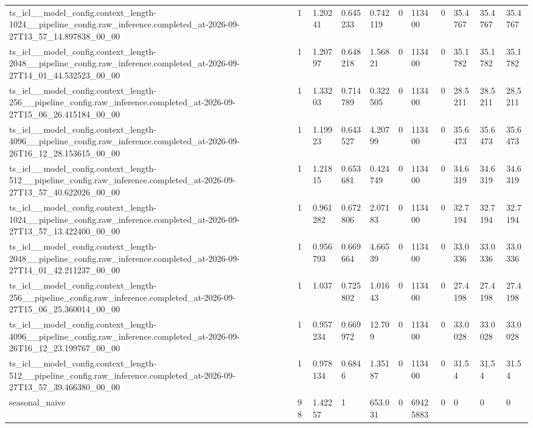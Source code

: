 \begin{tabular}{lllllllllll}
ts\_icl\_\_model\_config.context\_length-1024\_\_pipeline\_config.raw\_inference.completed\_at-2026-09-27T13\_57\_14.897838\_00\_00 & 1 & 1.20241 & 0.645233 & 0.742119 & 0 & 113400 & 0 & 35.4767 & 35.4767 & 35.4767 \\
ts\_icl\_\_model\_config.context\_length-2048\_\_pipeline\_config.raw\_inference.completed\_at-2026-09-27T14\_01\_44.532523\_00\_00 & 1 & 1.20797 & 0.648218 & 1.56821 & 0 & 113400 & 0 & 35.1782 & 35.1782 & 35.1782 \\
ts\_icl\_\_model\_config.context\_length-256\_\_pipeline\_config.raw\_inference.completed\_at-2026-09-27T15\_06\_26.415184\_00\_00 & 1 & 1.33203 & 0.714789 & 0.322505 & 0 & 113400 & 0 & 28.5211 & 28.5211 & 28.5211 \\
ts\_icl\_\_model\_config.context\_length-4096\_\_pipeline\_config.raw\_inference.completed\_at-2026-09-26T16\_12\_28.153615\_00\_00 & 1 & 1.19923 & 0.643527 & 4.20799 & 0 & 113400 & 0 & 35.6473 & 35.6473 & 35.6473 \\
ts\_icl\_\_model\_config.context\_length-512\_\_pipeline\_config.raw\_inference.completed\_at-2026-09-27T13\_57\_40.622026\_00\_00 & 1 & 1.21815 & 0.653681 & 0.424749 & 0 & 113400 & 0 & 34.6319 & 34.6319 & 34.6319 \\
ts\_icl\_\_model\_config.context\_length-1024\_\_pipeline\_config.raw\_inference.completed\_at-2026-09-27T13\_57\_13.422400\_00\_00 & 1 & 0.961282 & 0.672806 & 2.07183 & 0 & 113400 & 0 & 32.7194 & 32.7194 & 32.7194 \\
ts\_icl\_\_model\_config.context\_length-2048\_\_pipeline\_config.raw\_inference.completed\_at-2026-09-27T14\_01\_42.211237\_00\_00 & 1 & 0.956793 & 0.669664 & 4.66539 & 0 & 113400 & 0 & 33.0336 & 33.0336 & 33.0336 \\
ts\_icl\_\_model\_config.context\_length-256\_\_pipeline\_config.raw\_inference.completed\_at-2026-09-27T15\_06\_25.360014\_00\_00 & 1 & 1.037 & 0.725802 & 1.01643 & 0 & 113400 & 0 & 27.4198 & 27.4198 & 27.4198 \\
ts\_icl\_\_model\_config.context\_length-4096\_\_pipeline\_config.raw\_inference.completed\_at-2026-09-26T16\_12\_23.199767\_00\_00 & 1 & 0.957234 & 0.669972 & 12.709 & 0 & 113400 & 0 & 33.0028 & 33.0028 & 33.0028 \\
ts\_icl\_\_model\_config.context\_length-512\_\_pipeline\_config.raw\_inference.completed\_at-2026-09-27T13\_57\_39.466380\_00\_00 & 1 & 0.978134 & 0.6846 & 1.35187 & 0 & 113400 & 0 & 31.54 & 31.54 & 31.54 \\
seasonal\_naive & 98 & 1.42257 & 1 & 653.031 & 0 & 69425883 & 0 & 0 & 0 & 0 \\
\bottomrule
\end{tabular}
